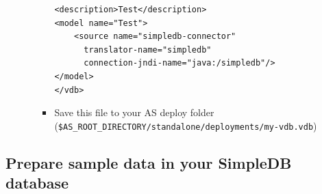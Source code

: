 \documentclass[oneside,12pt]{fithesis2}
\begin{document}
\begin{enumerate}
\begin{itemize}
\begin{itemize}
\begin{Verbatim}[fontsize=\small]
<description>Test</description>
<model name="Test">
    <source name="simpledb-connector" 
	  translator-name="simpledb" 
	  connection-jndi-name="java:/simpledb"/>
</model>
</vdb>   
  \end{Verbatim}
 \item Save this file to your AS deploy folder (\texttt{\$AS\_ROOT\_DIRECTORY/\allowbreak standalone/deployments/my-vdb.vdb})
 \end{itemize}

 \end{itemize}

\end{enumerate}
\subsection*{Prepare sample data in your SimpleDB database}
\end{document}
